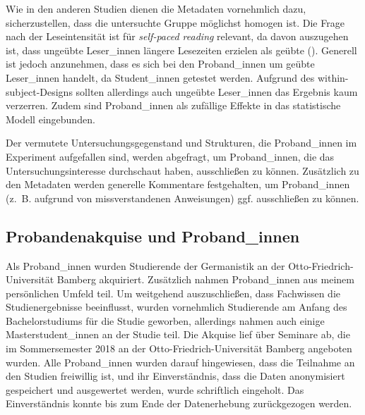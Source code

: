 Wie in den anderen Studien dienen die Metadaten vornehmlich dazu, sicherzustellen, dass die untersuchte Gruppe möglichst homogen ist. Die Frage nach der Leseintensität ist für \textit{self-paced reading}  relevant, da davon auszugehen ist, dass ungeübte Leser\_innen längere Lesezeiten erzielen als geübte (\cite[43]{Jegerski.2014}). Generell ist jedoch anzunehmen, dass es sich bei den Proband\_innen um geübte Leser\_innen handelt, da Student\_innen getestet werden. Aufgrund des within-subject-Designs sollten allerdings auch ungeübte Leser\_innen das Ergebnis kaum verzerren. Zudem sind Proband\_innen als zufällige Effekte in das statistische Modell eingebunden. 



Der vermutete Untersuchungsgegenstand und Strukturen, die Pro\-\mbox{band\_in}\-nen im Experiment aufgefallen sind, werden abgefragt, um Pro\-\mbox{band\_in}\-nen, die das Untersuchungsinteresse durchschaut haben, ausschließen zu können. Zusätzlich zu den Metadaten werden generelle Kommentare festgehalten, um Pro\-\mbox{band\_in}\-nen (z.~B. aufgrund von missverstandenen Anweisungen) ggf. ausschließen zu können. 

\subsection{Probandenakquise und Proband\_innen}\label{selfpacedprob}\largerpage
\begin{sloppypar}
Als Proband\_innen wurden Studierende der Germanistik an der Otto-Friedrich-Universität Bamberg akquiriert. Zusätzlich nahmen Proband\_innen aus meinem persönlichen Umfeld teil. Um weitgehend auszuschließen, dass Fachwissen die Studienergebnisse beeinflusst, wurden vornehmlich Studierende am Anfang des Bachelorstudiums für die Studie geworben, allerdings nahmen auch einige Masterstudent\_innen an der Studie teil. Die Akquise lief über Seminare ab, die im Sommersemester 2018 an der Otto-Friedrich-Universität Bamberg angeboten wurden. Alle Proband\_innen wurden darauf hingewiesen, dass die Teilnahme an den Studien freiwillig ist, und ihr Einverständnis, dass die Daten anonymisiert gespeichert und ausgewertet werden, wurde schriftlich eingeholt. Das Einverständnis konnte bis zum Ende der Datenerhebung zurückgezogen werden. 
\end{sloppypar}

